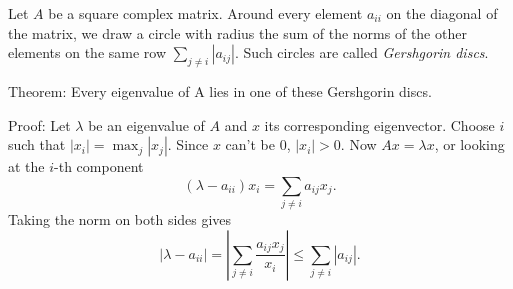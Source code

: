 \documentclass[12pt]{article}
\begin{document}
Let $A$ be a square complex matrix. Around every element $a_{ii}$ on the diagonal of the matrix, we draw a circle with radius the sum of the norms of the other elements on the same row $\sum_{j\neq i}|a_{ij}|$. Such circles are called \emph{Gershgorin discs}. 

Theorem: Every eigenvalue of A lies in one of these Gershgorin discs.

Proof: Let $\lambda$ be an eigenvalue of $A$ and $x$ its corresponding eigenvector. Choose $i$ such that $|x_i|={\max}_j |x_j|$. Since $x$ can't be $0$, $|x_i|>0$. Now $Ax=\lambda x$, or looking at the $i$-th component
$$ (\lambda - a_{ii})x_i = \sum_{j\neq i} a_{ij}x_j.$$ Taking the norm on both sides gives $$|\lambda - a_{ii}|=|\sum_{j\neq i} \frac{a_{ij}x_j}{x_i}|\leq \sum_{j\neq i}|a_{ij}|.$$
\end{document}
